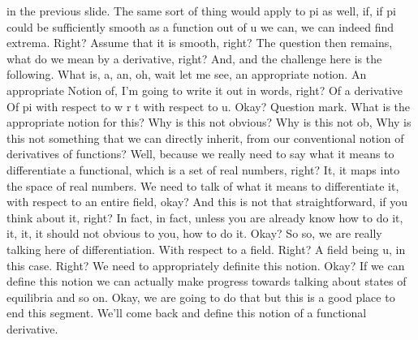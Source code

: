 \documentclass[10pt]{article}
\begin{document}
{in the previous slide. The same sort of thing would apply to pi as well, if, if pi could be sufficiently smooth as a function out of u we can, we can indeed find extrema. Right? Assume that it is smooth, right? The question then remains, what do we mean by a derivative, right? And, and the challenge here is the following. What is, a, an, oh, wait let me see, an appropriate notion. An appropriate Notion of, I'm going to write it out in words, right? Of a derivative Of pi with respect to w r t with respect to u. Okay? Question mark. What is the appropriate notion for this? Why is this not obvious? Why is this not ob, Why is this not something that we can directly inherit, from our conventional notion of derivatives of functions? Well, because we really need to say what it means to differentiate a functional, which is a set of real numbers, right? It, it maps into the space of real numbers. We need to talk of what it means to differentiate it, with respect to an entire field, okay? And this is not that straightforward, if you think about it, right? In fact, in fact, unless you are already know how to do it, it, it, it should not obvious to you, how to do it. Okay? So so, we are really talking here of differentiation. With respect to a field. Right? A field being u, in this case. Right? We need to appropriately definite this notion. Okay? If we can define this notion we can actually make progress towards talking about  states of equilibria and so on. Okay, we are going to do that but this is a good place to end this segment. We'll come back and define this notion of a functional derivative.

}
\end{document}
